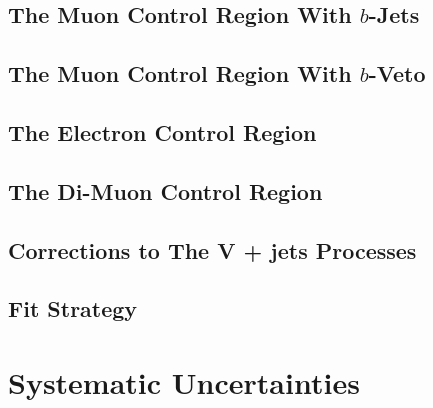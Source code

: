 \documentclass[10pt,twoside,cucitura,classica,openany]{toptesi}
\begin{document}


\subsection{The Muon Control Region With $b$-Jets}
\label{sec:muon-cr-bjet}



\subsection{The Muon Control Region With $b$-Veto}
\label{sec:muon-cr-bveto}



\subsection{The Electron Control Region}
\label{sec:ele-cr}



\subsection{The Di-Muon Control Region}
\label{sec:dimuon-cr}



\subsection{Corrections to The V + jets Processes}
\label{sec:corrections-vjets}



\subsection{Fit Strategy}
\label{sec:fit-strategy}




% 

\section{Systematic Uncertainties}
\label{sec:syst-uncert-1}
\end{document}
